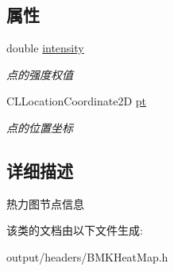 \subsection*{属性}
\begin{DoxyCompactItemize}
\item 
\hypertarget{interface_b_m_k_heat_map_node_ac1ab14f83204a0e5f4a16180acc30742}{}double \hyperlink{interface_b_m_k_heat_map_node_ac1ab14f83204a0e5f4a16180acc30742}{intensity}\label{interface_b_m_k_heat_map_node_ac1ab14f83204a0e5f4a16180acc30742}

\begin{DoxyCompactList}\small\item\em 点的强度权值 \end{DoxyCompactList}\item 
\hypertarget{interface_b_m_k_heat_map_node_a7dcd370e65e376d8253e9a9d127dc984}{}C\+L\+Location\+Coordinate2\+D \hyperlink{interface_b_m_k_heat_map_node_a7dcd370e65e376d8253e9a9d127dc984}{pt}\label{interface_b_m_k_heat_map_node_a7dcd370e65e376d8253e9a9d127dc984}

\begin{DoxyCompactList}\small\item\em 点的位置坐标 \end{DoxyCompactList}\end{DoxyCompactItemize}


\subsection{详细描述}
热力图节点信息 

该类的文档由以下文件生成\+:\begin{DoxyCompactItemize}
\item 
output/headers/B\+M\+K\+Heat\+Map.\+h\end{DoxyCompactItemize}
